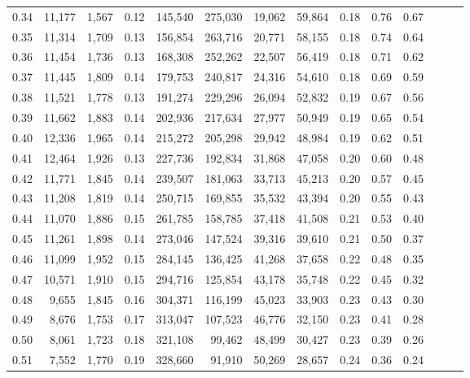 \begin{tabular}{rrrrrrrrrrrrrr}
0.34 &  11,177 &  1,567 &  0.12 &  145,540 &  275,030 &  19,062 &  59,864 &  0.18 &  0.76 &      0.67 \\
0.35 &  11,314 &  1,709 &  0.13 &  156,854 &  263,716 &  20,771 &  58,155 &  0.18 &  0.74 &      0.64 \\
0.36 &  11,454 &  1,736 &  0.13 &  168,308 &  252,262 &  22,507 &  56,419 &  0.18 &  0.71 &      0.62 \\
0.37 &  11,445 &  1,809 &  0.14 &  179,753 &  240,817 &  24,316 &  54,610 &  0.18 &  0.69 &      0.59 \\
0.38 &  11,521 &  1,778 &  0.13 &  191,274 &  229,296 &  26,094 &  52,832 &  0.19 &  0.67 &      0.56 \\
0.39 &  11,662 &  1,883 &  0.14 &  202,936 &  217,634 &  27,977 &  50,949 &  0.19 &  0.65 &      0.54 \\
0.40 &  12,336 &  1,965 &  0.14 &  215,272 &  205,298 &  29,942 &  48,984 &  0.19 &  0.62 &      0.51 \\
0.41 &  12,464 &  1,926 &  0.13 &  227,736 &  192,834 &  31,868 &  47,058 &  0.20 &  0.60 &      0.48 \\
0.42 &  11,771 &  1,845 &  0.14 &  239,507 &  181,063 &  33,713 &  45,213 &  0.20 &  0.57 &      0.45 \\
0.43 &  11,208 &  1,819 &  0.14 &  250,715 &  169,855 &  35,532 &  43,394 &  0.20 &  0.55 &      0.43 \\
0.44 &  11,070 &  1,886 &  0.15 &  261,785 &  158,785 &  37,418 &  41,508 &  0.21 &  0.53 &      0.40 \\
0.45 &  11,261 &  1,898 &  0.14 &  273,046 &  147,524 &  39,316 &  39,610 &  0.21 &  0.50 &      0.37 \\
0.46 &  11,099 &  1,952 &  0.15 &  284,145 &  136,425 &  41,268 &  37,658 &  0.22 &  0.48 &      0.35 \\
0.47 &  10,571 &  1,910 &  0.15 &  294,716 &  125,854 &  43,178 &  35,748 &  0.22 &  0.45 &      0.32 \\
0.48 &   9,655 &  1,845 &  0.16 &  304,371 &  116,199 &  45,023 &  33,903 &  0.23 &  0.43 &      0.30 \\
0.49 &   8,676 &  1,753 &  0.17 &  313,047 &  107,523 &  46,776 &  32,150 &  0.23 &  0.41 &      0.28 \\
0.50 &   8,061 &  1,723 &  0.18 &  321,108 &   99,462 &  48,499 &  30,427 &  0.23 &  0.39 &      0.26 \\
0.51 &   7,552 &  1,770 &  0.19 &  328,660 &   91,910 &  50,269 &  28,657 &  0.24 &  0.36 &      0.24 \\

\end{tabular}
